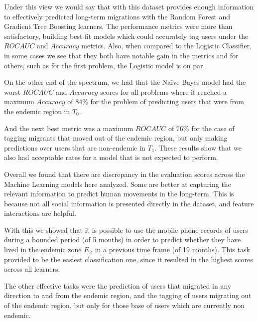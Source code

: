 Under this view we would say that with this dataset provides enough information to effectively predicted long-term migrations with the Random Forest and Gradient Tree Boosting learners.
The performance metrics were more than satisfactory, building best-fit models which could accurately tag users under the $ROC AUC$ and $Accuracy$ metrics.
Also, when compared to the Logistic Classifier, in some cases we see that they both have notable gain in the metrics and for others, such as for the first problem, the Logistic model is on par.

On the other end of the spectrum, we had that the Naive Bayes model had the worst $ROC AUC$ and $Accuracy$ scores for all problems where it reached a maximum $Accuracy$ of $84\%$ for the problem of predicting users that were from the endemic region in $T_0$.

And the next best metric was a maximum $ROC AUC$ of $76\%$ for the case of tagging migrants that moved out of the endemic region, but only making predictions over users that are non-endemic in $T_1$.
These results show that we also had acceptable rates for a model that is not expected to perform.

Overall we found that there are discrepancy in the evaluation scores across the Machine Learning models here analyzed.
Some are better at capturing the relevant information to predict human movements in the long-term.
This is because not all social information is presented directly in the dataset, and feature interactions are helpful.

With this we showed that it is possible to use the mobile phone records of users during a bounded period (of 5 months) in order to predict whether they have lived in the endemic zone $E_Z$ in a previous time frame (of 19 months).
This task provided to be the easiest classification one, since it resulted in the highest scores across all learners.

The other effective tasks were the prediction of users that migrated in any direction to and from the endemic region, and the tagging of users migrating out of the endemic region, but only for those base of users which are currently non endemic.



